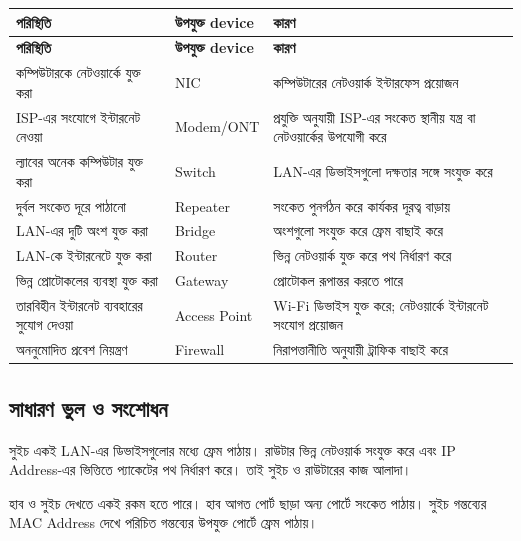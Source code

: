 \begingroup
\begin{longtable}{|p{}|p{}|p{}|}
\hline
\textbf{পরিস্থিতি} & \textbf{উপযুক্ত device} & \textbf{কারণ} \\
\hline
\endfirsthead
\hline
\textbf{পরিস্থিতি} & \textbf{উপযুক্ত device} & \textbf{কারণ} \\
\hline
\endhead

কম্পিউটারকে নেটওয়ার্কে যুক্ত করা & NIC & কম্পিউটারের নেটওয়ার্ক ইন্টারফেস প্রয়োজন \\
\hline
ISP-এর সংযোগে ইন্টারনেট নেওয়া & Modem/ONT & প্রযুক্তি অনুযায়ী ISP-এর সংকেত স্থানীয় যন্ত্র বা নেটওয়ার্কের উপযোগী করে \\
\hline
ল্যাবের অনেক কম্পিউটার যুক্ত করা & Switch & LAN-এর ডিভাইসগুলো দক্ষতার সঙ্গে সংযুক্ত করে \\
\hline
দুর্বল সংকেত দূরে পাঠানো & Repeater & সংকেত পুনর্গঠন করে কার্যকর দূরত্ব বাড়ায় \\
\hline
LAN-এর দুটি অংশ যুক্ত করা & Bridge & অংশগুলো সংযুক্ত করে ফ্রেম বাছাই করে \\
\hline
LAN-কে ইন্টারনেটে যুক্ত করা & Router & ভিন্ন নেটওয়ার্ক যুক্ত করে পথ নির্ধারণ করে \\
\hline
ভিন্ন প্রোটোকলের ব্যবস্থা যুক্ত করা & Gateway & প্রোটোকল রূপান্তর করতে পারে \\
\hline
তারবিহীন ইন্টারনেট ব্যবহারের সুযোগ দেওয়া & Access Point & Wi-Fi ডিভাইস যুক্ত করে; নেটওয়ার্কে ইন্টারনেট সংযোগ প্রয়োজন \\
\hline
অননুমোদিত প্রবেশ নিয়ন্ত্রণ & Firewall & নিরাপত্তানীতি অনুযায়ী ট্রাফিক বাছাই করে \\
\hline
\end{longtable}
\endgroup




\subsection{সাধারণ ভুল ও সংশোধন}

সুইচ একই LAN-এর ডিভাইসগুলোর মধ্যে ফ্রেম পাঠায়। রাউটার ভিন্ন নেটওয়ার্ক সংযুক্ত করে এবং IP Address-এর ভিত্তিতে প্যাকেটের পথ নির্ধারণ করে। তাই সুইচ ও রাউটারের কাজ আলাদা।

হাব ও সুইচ দেখতে একই রকম হতে পারে। হাব আগত পোর্ট ছাড়া অন্য পোর্টে সংকেত পাঠায়। সুইচ গন্তব্যের MAC Address দেখে পরিচিত গন্তব্যের উপযুক্ত পোর্টে ফ্রেম পাঠায়।

